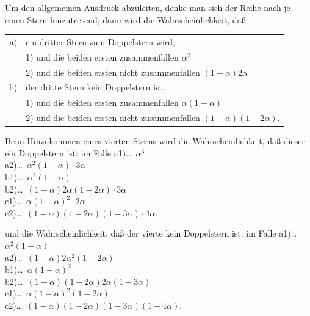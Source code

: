 \documentclass[12pt,a4paper]{article}
\theoremstyle{plain}
\theoremstyle{definition}
\theoremstyle{remark}
\begin{document}
Um den allgemeinen Ausdruck abzuleiten, denke man sich der Reihe nach je einen Stern hinzutretend; dann wird die Wahrscheinlichkeit, da\ss{}
\begin{center}
\begin{tabular}{rl}
a) & ein dritter Stern zum Doppelstern wird, \\
   & 1) und die beiden ersten zusammenfallen \quad\quad\quad\quad $\alpha^2$ \\
   & 2) und die beiden ersten nicht zusammenfallen \quad $(1 - \alpha)2\alpha$ \\
b) & der dritte Stern kein Doppelstern ist, \\
   & 1) und die beiden ersten zusammenfallen \quad\quad\quad\quad $\alpha(1-\alpha)$ \\
   & 2) und die beiden ersten nicht zusammenfallen \quad $(1-\alpha)(1-2\alpha)$.
\end{tabular}
\end{center}

Beim Hinzukommen eines vierten Sterns wird die Wahrscheinlichkeit, da\ss{} dieser ein Doppelstern ist:
im Falle a1)\ldots\ $\alpha^3$ \\
\phantom{im Falle} a2)\ldots\ $\alpha^2(1-\alpha) \cdot 3\alpha$ \\
\phantom{im Falle} b1)\ldots\ $\alpha^2(1-\alpha)$ \\
\phantom{im Falle} b2)\ldots\ $(1-\alpha)2\alpha(1-2\alpha) \cdot 3\alpha$ \\
\phantom{im Falle} c1)\ldots\ $\alpha(1-\alpha)^2 \cdot 2\alpha$ \\
\phantom{im Falle} c2)\ldots\ $(1-\alpha)(1-2\alpha)(1-3\alpha) \cdot 4\alpha$.

und die Wahrscheinlichkeit, da\ss{} der vierte kein Doppelstern ist:
im Falle a1)\ldots\ $\alpha^2(1-\alpha)$ \\
\phantom{im Falle} a2)\ldots\ $(1-\alpha)2\alpha^2(1-2\alpha)$ \\
\phantom{im Falle} b1)\ldots\ $\alpha(1-\alpha)^2$ \\
\phantom{im Falle} b2)\ldots\ $(1-\alpha)(1-2\alpha)2\alpha(1-3\alpha)$ \\
\phantom{im Falle} c1)\ldots\ $\alpha(1-\alpha)^2(1-2\alpha)$ \\
\phantom{im Falle} c2)\ldots\ $(1-\alpha)(1-2\alpha)(1-3\alpha)(1-4\alpha)$.
\end{document}
